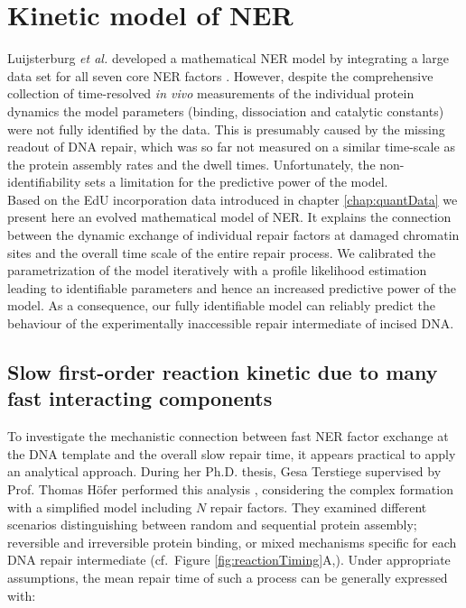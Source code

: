 \chapter{Kinetic model of NER}
\label{chap:kineticNERmodel}

Luijsterburg \textit{et al.} developed a mathematical NER model by integrating a large data set for all seven core NER factors \cite{Luijsterburg2010}. However, despite the comprehensive collection of time-resolved \textit{in vivo} measurements of the individual protein dynamics the model parameters (binding, dissociation and catalytic constants) were not fully identified by the data. This is presumably caused by the missing readout of DNA repair, which was so far not measured on a similar time-scale as the protein assembly rates and the dwell times. Unfortunately, the non-identifiability sets a limitation for the predictive power of the model. \\ 
Based on the EdU incorporation data introduced in chapter \ref{chap:quantData} we present here an evolved mathematical model of NER. It explains the connection between the dynamic exchange of individual repair factors at damaged chromatin sites and the overall time scale of the entire repair process. We calibrated the parametrization of the model iteratively with a profile likelihood estimation leading to identifiable parameters and hence an increased predictive power of the model. As a consequence, our fully identifiable model can reliably predict the behaviour of the experimentally inaccessible repair intermediate of incised DNA.\\
   



\section{Slow first-order reaction kinetic due to many fast interacting components}
\label{sec:toyModel}
To investigate the mechanistic connection between fast NER factor exchange at the DNA template and the overall slow repair time, it appears practical to apply an analytical approach. During her Ph.D. thesis, Gesa Terstiege supervised by Prof. Thomas H\"ofer performed this analysis \cite{Terstiege2010,Verbruggen2014}, considering the complex formation with a simplified model including $N$ repair factors. They examined different scenarios distinguishing between random and sequential protein assembly; reversible and irreversible protein binding, or mixed mechanisms specific for each DNA repair intermediate (cf.\ Figure \ref{fig:reactionTiming}A,\cite{Verbruggen2014}). Under appropriate assumptions, the mean repair time of such a process can be generally expressed with:

